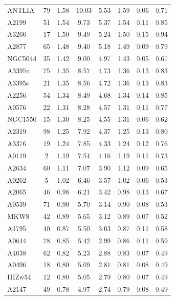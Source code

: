 \documentclass[10pt,aps,pra,reprint,amsmath,amsfonts,amssymb,showpacs,nofootinbib,floatfix]{revtex4-1}
\begin{document}
\begin{table}
\begin{minipage}{2.0\columnwidth}
\begin{tabular}{l  c c c c c c c}
ANTLIA   &  79 &   1.58 &  10.03 &   5.53 &   1.59 &   0.06 &   0.71 \\
A2199    &  51 &   1.54 &   9.73 &   5.37 &   1.54 &   0.11 &   0.85 \\
A3266    &  17 &   1.50 &   9.49 &   5.24 &   1.50 &   0.15 &   0.94 \\
A2877    &  65 &   1.48 &   9.40 &   5.18 &   1.49 &   0.09 &   0.79 \\
NGC5044  &  35 &   1.42 &   9.00 &   4.97 &   1.43 &   0.05 &   0.61 \\
A3395n   &  75 &   1.35 &   8.57 &   4.73 &   1.36 &   0.13 &   0.83 \\
A3395s   &  21 &   1.35 &   8.56 &   4.72 &   1.36 &   0.13 &   0.83 \\
A2256    &  54 &   1.34 &   8.49 &   4.68 &   1.34 &   0.14 &   0.85 \\
A0576    &  22 &   1.31 &   8.28 &   4.57 &   1.31 &   0.11 &   0.77 \\
NGC1550  &  15 &   1.30 &   8.25 &   4.55 &   1.31 &   0.06 &   0.62 \\
A2319    &  98 &   1.25 &   7.92 &   4.37 &   1.25 &   0.13 &   0.80 \\
A3376    &  19 &   1.24 &   7.85 &   4.33 &   1.24 &   0.12 &   0.76 \\
A0119    &   2 &   1.19 &   7.54 &   4.16 &   1.19 &   0.11 &   0.73 \\
A2634    &  60 &   1.11 &   7.07 &   3.90 &   1.12 &   0.09 &   0.65 \\
A0262    &   5 &   1.02 &   6.46 &   3.57 &   1.02 &   0.06 &   0.53 \\
A2065    &  46 &   0.98 &   6.21 &   3.42 &   0.98 &   0.13 &   0.67 \\
A0539    &  71 &   0.90 &   5.70 &   3.14 &   0.90 &   0.08 &   0.53 \\
MKW8     &  42 &   0.89 &   5.65 &   3.12 &   0.89 &   0.07 &   0.52 \\
A1795    &  40 &   0.87 &   5.50 &   3.03 &   0.87 &   0.11 &   0.58 \\
A0644    &  78 &   0.85 &   5.42 &   2.99 &   0.86 &   0.11 &   0.59 \\
A4038    &  62 &   0.82 &   5.23 &   2.88 &   0.83 &   0.07 &   0.49 \\
A0496    &  18 &   0.80 &   5.09 &   2.81 &   0.81 &   0.08 &   0.49 \\
IIIZw54  &  12 &   0.80 &   5.05 &   2.79 &   0.80 &   0.07 &   0.49 \\
A2147    &  49 &   0.78 &   4.97 &   2.74 &   0.79 &   0.08 &   0.49 \\

\end{tabular}
\end{minipage}
\end{table}
\end{document}
